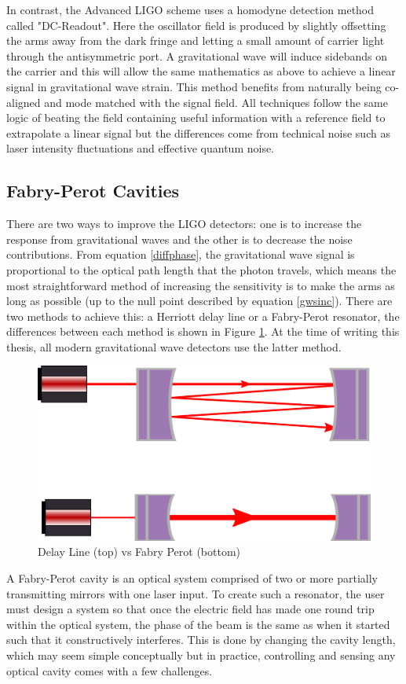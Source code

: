 		In contrast, the Advanced LIGO scheme uses a homodyne detection \cite{HildDCReadout} method called "DC-Readout".  Here the oscillator field is produced by slightly offsetting the arms away from the dark fringe and letting a small amount of carrier light through the antisymmetric port.  A gravitational wave will induce sidebands on the carrier and this will allow the same mathematics as above to achieve a linear signal in gravitational wave strain. This method benefits from naturally being co-aligned and mode matched with the signal field.  All techniques follow the same logic of beating the field containing useful information with a reference field to extrapolate a linear signal but the differences come from technical noise such as laser intensity fluctuations and effective quantum noise.
	
		\subsection{Fabry-Perot Cavities}\label{FP}
		There are two ways to improve the LIGO detectors: one is to increase the response from gravitational waves and the other is to decrease the noise contributions. From equation \ref{diffphase}, the gravitational wave signal is proportional to the optical path length that the photon travels, which means the most straightforward method of increasing the sensitivity is to make the arms as long as possible (up to the null point described by equation \ref{gwsinc}).  There are two methods to achieve this: a Herriott delay line or a Fabry-Perot resonator, the differences between each method is shown in Figure \ref{fig:FPvDL}.  At the time of writing this thesis, all modern gravitational wave detectors use the latter method.
		
		\begin{figure}[h]
		\centering
		\includegraphics[width=.5 \textwidth]{../Figures/FPvDL.png}
		\caption{Delay Line (top) vs Fabry Perot (bottom)}
		\label{fig:FPvDL}
		\end{figure}
	
		A Fabry-Perot cavity is an optical system comprised of two or more partially transmitting mirrors with one laser input.  To create such a resonator, the user must design a system so that once the electric field has made one round trip within the optical system, the phase of the beam is the same as when it started such that it constructively interferes.  This is done by changing the cavity length, which may seem simple conceptually but in practice, controlling and sensing any optical cavity comes with a few challenges.
		

